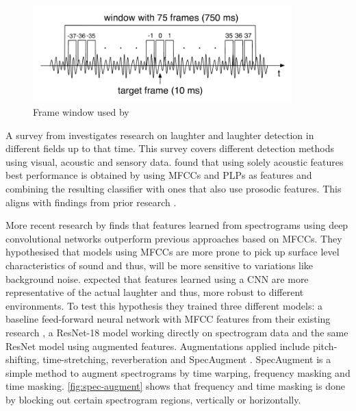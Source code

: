 \documentclass[bsc,frontabs,parskip,deptreport]{infthesis}
\begin{document}
\begin{figure}[htp]
    \centering
    \includegraphics[width=10cm]{imgs/Knox_window.png}
    \caption{Frame window used by \citet{knox2006automatic}}
    \label{fig:knox_window}
\end{figure}

A survey from \citet{cosentino2016quantitative} investigates research on laughter and laughter detection in different fields up to that time.
This survey covers different detection methods using visual, acoustic and sensory data.
\citet{cosentino2016quantitative} found that using solely acoustic features best performance is obtained by using MFCCs and PLPs as features and combining the resulting classifier with ones that also use prosodic features.
This aligns with findings from prior research \citep{truong2007automatic, knox2006automatic}.

More recent research by \citet{gillick2021robust} finds that features learned from spectrograms using deep convolutional networks outperform previous approaches based on MFCCs.
They hypothesised that models using MFCCs are more prone to pick up surface level characteristics of sound and thus, will be more sensitive to variations like background noise.
\citet{gillick2021robust} expected that features learned using a CNN are more representative of the actual laughter and thus, more robust to different environments. 
To test this hypothesis they trained three different models: a baseline feed-forward neural network with MFCC features from their existing research \citep{ryokai2018capturing}, a ResNet-18 \citep{he2016deep} model working directly on spectrogram data and the same ResNet model using augmented features. Augmentations applied include pitch-shifting, time-stretching, reverberation and SpecAugment \citep{park2019specaugment}. SpecAugment is a simple method to augment spectrograms by time warping, frequency masking and time masking. \autoref{fig:spec-augment} shows that frequency and time masking is done by blocking out certain spectrogram regions, vertically or horizontally. 
\end{document}
